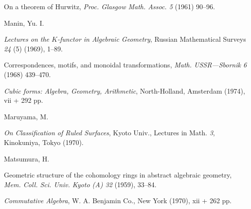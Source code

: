 {\noindent\hangindent=25bp\hspace*{6bp}%
On a theorem of Hurwitz, \emph{Proc. Glasgow Math. Assoc. 5} (1961) 90--96.\par
\par\vspace{2.15pt}\noindent \hypertarget{bib-479-12}{}Manin, Yu. I.\par
\noindent\hangindent=25bp\hspace*{6bp}%
\emph{Lectures on the $K$-functor in Algebraic Geometry}, Russian Mathematical Surveys \emph{24} (5) (1969), 1--89.\par
\noindent\hangindent=25bp\hspace*{6bp}%
Correspondences, motifs, and monoidal transformations, \emph{Math. USSR---Sbornik 6} (1968) 439--470.\par
\noindent\hangindent=25bp\hspace*{6bp}%
\emph{Cubic forms: Algebra, Geometry, Arithmetic}, North-Holland, Amsterdam (1974), vii + 292 pp.\par
\par\vspace{2.15pt}\noindent \hypertarget{bib-479-15}{}Maruyama, M.\par
\noindent\hangindent=25bp\hspace*{6bp}%
\emph{On Classification of Ruled Surfaces}, Kyoto Univ., Lectures in Math. \emph{3}, Kinokuniya, Tokyo (1970).\par
\par\vspace{2.15pt}\noindent \hypertarget{bib-479-16}{}Matsumura, H.\par
\noindent\hangindent=25bp\hspace*{6bp}%
Geometric structure of the cohomology rings in abstract algebraic geometry, \emph{Mem. Coll. Sci. Univ. Kyoto (A) 32} (1959), 33--84.\par
\noindent\hangindent=25bp\hspace*{6bp}%
\emph{Commutative Algebra}, W. A. Benjamin Co., New York (1970), xii + 262 pp.\par
}
